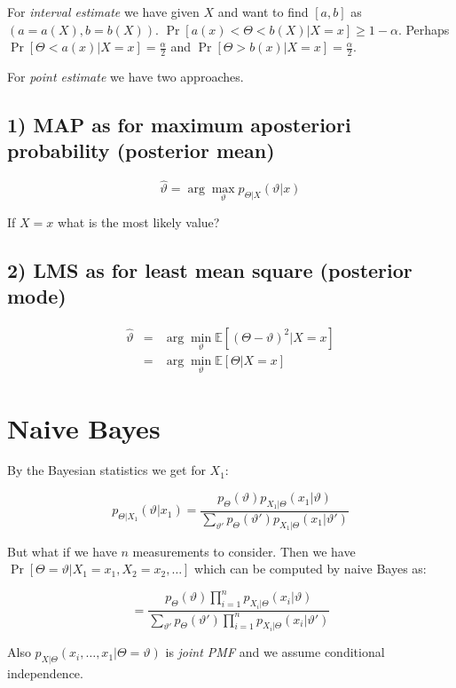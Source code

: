 For \textit{interval estimate} we have given $X$ and want to find $[a,b]$ as $(a = a(X), b = b(X))$. $\Pr[a(x) < \Theta < b(X) \vert X = x] \geq 1 - \alpha$. Perhaps $\Pr[\Theta < a(x) \vert X =x ] = \frac{\alpha}{2}$ and $\Pr[\Theta > b(x) \vert X =x ] = \frac{\alpha}{2}$.

For \textit{point estimate} we have two approaches.

\subsection{1) MAP as for maximum aposteriori probability (posterior mean)}

$$
\hat{\vartheta} = \arg\max_{\vartheta} p_{\Theta \vert X} (\vartheta \vert x)
$$

If $X = x$ what is the most likely value?

\subsection{2) LMS as for least mean square (posterior mode)}

$$
\begin{array}{rcl}
\hat{\vartheta} & = & \arg\min_{\vartheta} \mathbb{E}[(\Theta - \vartheta)^{2} \vert X = x] \\
& = & \arg\min_{\vartheta} \mathbb{E}[\Theta \vert X = x]
\end{array}
$$

\section{Naive Bayes}

By the Bayesian statistics we get for $X_{1}$:

$$
p_{\Theta\vert X_{1}} (\vartheta \vert x_{1}) = \frac{p_{\Theta}(\vartheta) p_{X_{1} \vert\Theta}(x_{1} \vert \vartheta)}{\sum_{\vartheta'} p_{\Theta}(\vartheta')p_{X_{1}\vert\Theta}(x_{1} \vert \vartheta')}
$$

But what if we have $n$ measurements to consider. Then we have $\Pr[\Theta = \vartheta \vert X_{1} = x_{1}, X_{2} = x_{2}, \dots]$ which can be computed by naive Bayes as:

$$
= \frac{p_{\Theta}(\vartheta) \prod_{i=1}^{n}p_{X_{i}\vert \Theta} (x_{i} \vert \vartheta)}{\sum_{\vartheta'} p_{\Theta}(\vartheta')\prod_{i=1}^{n}p_{X_{i}\vert \Theta} (x_{i} \vert \vartheta')}
$$

Also $p_{X \vert \Theta}(x_{i}, \dots, x_{1} \vert \Theta = \vartheta)$ is \textit{joint PMF} and we assume conditional independence.

